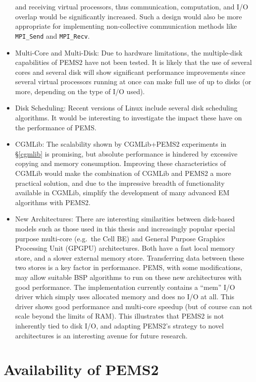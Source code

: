 \documentclass[12pt]{carletoncsthesis}
\begin{document}
\begin{itemize}
and receiving virtual processors, thus communication, computation, and I/O
overlap would be significantly increased.  Such a design would also be more
appropriate for implementing non-collective communication methods like {\tt
MPI\_Send} and {\tt MPI\_Recv}.
\item Multi-Core and Multi-Disk: Due to hardware limitations, the multiple-disk
capabilities of PEMS2 have not been tested.  It is likely that the use of
several cores and several disk will show significant performance improvements
since several virtual processors running at once can make full use of up to
 disks (or more, depending on the type of I/O used).
\item Disk Scheduling: Recent versions of Linux include several disk
scheduling algorithms.  It would be interesting to investigate the impact
these have on the performance of PEMS.
\item CGMLib: The scalability shown by CGMLib+PEMS2 experiments in
\S\ref{cgmlib} is promising, but absolute performance is hindered by excessive
copying and memory consumption.  Improving these characteristics of CGMLib
would make the combination of CGMLib and PEMS2 a more practical solution,
and due to the impressive breadth of functionality available in CGMLib,
simplify the development of many advanced EM algorithms with PEMS2.
\item New Architectures: There are interesting similarities between disk-based
models such as those used in this thesis and increasingly popular special
purpose multi-core (e.g.\ the Cell BE) and General Purpose Graphics Processing
Unit (GPGPU) architectures.  Both have a fast local memory store, and a slower
external memory store.  Transferring data between these two stores is a key
factor in performance.  PEMS, with some modifications, may allow suitable
BSP algorithms to run on these new architectures with good performance.
The implementation currently contains a ``mem'' I/O driver which simply uses
allocated memory and does no I/O at all.  This driver shows good performance
and multi-core speedup (but of course can not scale beyond the limits of RAM).
This illustrates that PEMS2 is not inherently tied to disk I/O, and
adapting PEMS2's strategy to novel architectures is an interesting avenue for
future research.
\end{itemize}






\appendix

\chapter{Availability of PEMS2}
\thispagestyle{empty}
\label{availability}
\end{document}
